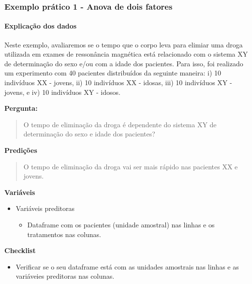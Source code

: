 \documentclass[
]{book}
\providecommand{\tightlist}{%
  \setlength{\itemsep}{0pt}\setlength{\parskip}{0pt}}
\begin{document}
\hypertarget{exemplo-pruxe1tico-1---anova-de-dois-fatores}{%
\subsubsection{Exemplo prático 1 - Anova de dois fatores}\label{exemplo-pruxe1tico-1---anova-de-dois-fatores}}

\hypertarget{explicauxe7uxe3o-dos-dados-7}{%
\paragraph{Explicação dos dados}\label{explicauxe7uxe3o-dos-dados-7}}

Neste exemplo, avaliaremos se o tempo que o corpo leva para elimiar uma droga utilizada em exames de ressonância magnética está relacionado com o sistema XY de determinação do sexo e/ou com a idade dos pacientes. Para isso, foi realizado um experimento com 40 pacientes distribuídos da seguinte maneira: i) 10 indivíduos XX - jovens, ii) 10 indivíduos XX - idosas, iii) 10 indivíduos XY - jovens, e iv) 10 indivíduos XY - idosos.

\textbf{Pergunta:}

\begin{quote}
O tempo de eliminação da droga é dependente do sistema XY de determinação do sexo e idade dos pacientes?
\end{quote}

\textbf{Predições}

\begin{quote}
O tempo de eliminação da droga vai ser mais rápido nas pacientes XX e jovens.
\end{quote}

\textbf{Variáveis}

\begin{itemize}
\tightlist
\item
  Variáveis preditoras

  \begin{itemize}
  \tightlist
  \item
    Dataframe com os pacientes (unidade amostral) nas linhas e os tratamentos nas colunas.
  \end{itemize}
\end{itemize}

\textbf{Checklist}

\begin{itemize}
\tightlist
\item
  Verificar se o seu dataframe está com as unidades amostrais nas linhas e as variáveies preditoras nas colunas.
\end{itemize}
\end{document}
